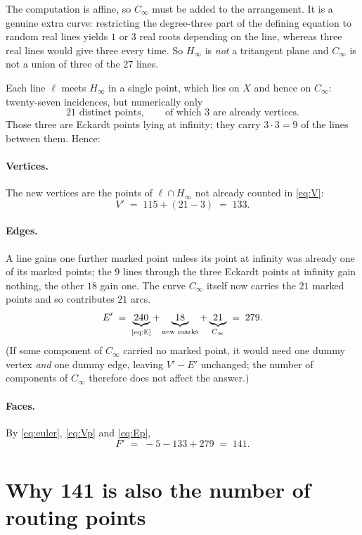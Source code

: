\documentclass[11pt]{article}
\newcommand{\Cinf}{C_\infty}
\newcommand{\Hinf}{H_\infty}
\begin{document}
The computation is affine, so $\Cinf$ must be added to the arrangement. It is a
genuine extra curve: restricting the degree-three part of the defining equation to
random real lines yields $1$ or $3$ real roots depending on the line, whereas three
real lines would give three every time. So $\Hinf$ is \emph{not} a tritangent plane
and $\Cinf$ is not a union of three of the $27$ lines.

Each line $\ell$ meets $\Hinf$ in a single point, which lies on $X$ and hence on
$\Cinf$: twenty-seven incidences, but numerically only
\[
  21 \text{ distinct points},\qquad\text{of which } 3 \text{ are already vertices.}
\]
Those three are Eckardt points lying at infinity; they carry $3\cdot 3=9$ of the
lines between them. Hence:

\paragraph{Vertices.} The new vertices are the points of $\ell\cap\Hinf$ not already
counted in \eqref{eq:V}:
\begin{equation}\label{eq:Vp}
  V' \;=\; 115 + (21-3) \;=\; 133 .
\end{equation}

\paragraph{Edges.} A line gains one further marked point unless its point at
infinity was already one of its marked points; the $9$ lines through the three
Eckardt points at infinity gain nothing, the other $18$ gain one. The curve
$\Cinf$ itself now carries the $21$ marked points and so contributes $21$ arcs.
\begin{equation}\label{eq:Ep}
  E' \;=\; \underbrace{240}_{\text{\eqref{eq:E}}} + \underbrace{18}_{\text{new marks}}
        + \underbrace{21}_{\Cinf} \;=\; 279 .
\end{equation}
(If some component of $\Cinf$ carried no marked point, it would need one dummy
vertex \emph{and} one dummy edge, leaving $V'-E'$ unchanged; the number of
components of $\Cinf$ therefore does not affect the answer.)

\paragraph{Faces.} By \eqref{eq:euler}, \eqref{eq:Vp} and \eqref{eq:Ep},
\[
  F' \;=\; -5 - 133 + 279 \;=\; \boxed{141}.
\]

\section{Why 141 is also the number of routing points}
\end{document}
